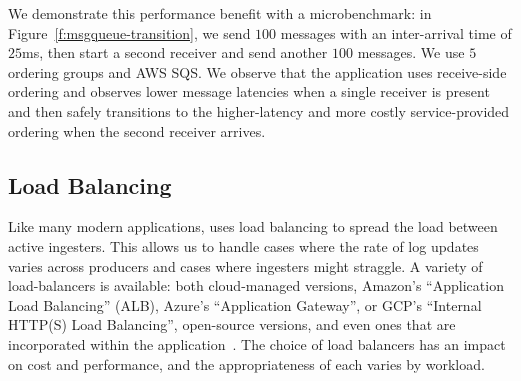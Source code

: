 
We demonstrate this performance benefit with a microbenchmark: in Figure~\ref{f:msgqueue-transition}, we send $100$ messages with an inter-arrival time of $25$ms, then start a second receiver and send another $100$ messages. We use $5$ ordering groups and AWS SQS. We observe that the application uses receive-side ordering and observes lower message latencies when a single receiver is present and then safely transitions to the higher-latency and more costly service-provided ordering when the second receiver arrives.






\subsection{Load Balancing}\label{s:app:lb}
Like many modern applications, \etlapp uses load balancing to spread the load between active ingesters. This allows us to handle cases where the rate of log updates varies across producers and cases where ingesters might straggle. A variety of load-balancers is available: both cloud-managed versions, \eg Amazon's ``Application Load Balancing'' (ALB), Azure's ``Application Gateway'', or GCP's ``Internal HTTP(S) Load Balancing'', open-source versions, and even ones that are incorporated within the application~\cite{service-router}. 
The choice of load balancers has an impact on cost and performance, and the appropriateness of each varies by workload.

